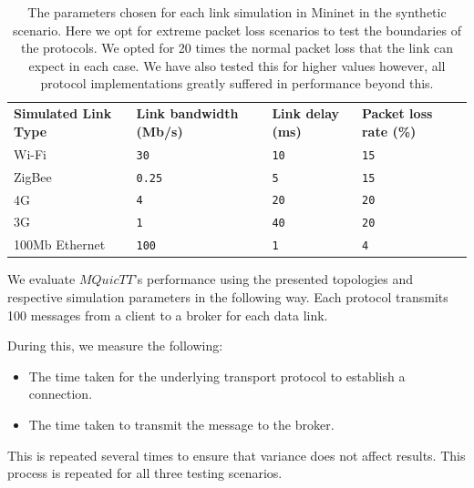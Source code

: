 \begin{table}[ht]
    \caption{The parameters chosen for each link simulation in Mininet in the synthetic scenario. Here we opt for extreme packet loss scenarios to test the boundaries of the protocols. We opted for 20 times the normal packet loss that the link can expect in each case. We have also tested this for higher values however, all protocol implementations greatly suffered in performance beyond this.}\label{tab:links:synth}
    \begin{tabular}{@{}llll@{}}
        \toprule
        \textbf{Simulated Link Type} & \textbf{Link bandwidth (Mb/s)} & \textbf{Link delay (ms)} & \textbf{Packet loss rate (\%)} \\
        Wi-Fi                        & \texttt{30}                    & \texttt{10}              & \texttt{15}                     \\
        ZigBee                       & \texttt{0.25}                  & \texttt{5}               & \texttt{15}                     \\
        4G                           & \texttt{4}                     & \texttt{20}              & \texttt{20}                   \\
        3G                           & \texttt{1}                     & \texttt{40}              & \texttt{20}                   \\
        100Mb Ethernet               & \texttt{100}                   & \texttt{1}               & \texttt{4}                   \\
        \bottomrule
    \end{tabular}
\end{table}

We evaluate $MQuicTT$'s performance using the presented topologies and respective simulation parameters in the following way.
Each protocol transmits 100 messages from a client to a broker for each data link.

During this, we measure the following:

\begin{itemize}
    \item The time taken for the underlying transport protocol to establish a connection.
    \item The time taken to transmit the message to the broker.
\end{itemize}

This is repeated several times to ensure that variance does not affect results.
This process is repeated for all three testing scenarios.

